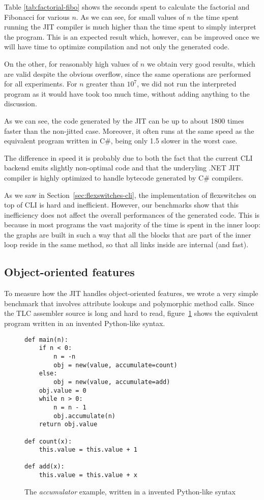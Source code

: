 Table \ref{tab:factorial-fibo} shows the seconds spent to calculate
the factorial and Fibonacci for various $n$.  As we can see, for small values
of $n$ the time spent running the JIT compiler is much higher than the time
spent to simply interpret the program.  This is an expected result
which, however, can be improved once we will have time
to optimize compilation and not only the generated code.

On the other, for reasonably high values of $n$ we obtain very good
results, which are valid despite the obvious overflow, since the 
same operations are performed for all experiments.
For $n$ greater than $10^7$, we did not run the interpreted program as it would have took too
much time, without adding anything to the discussion.

As we can see, the code generated by the JIT can be up to about 1800 times faster
than the non-jitted case.  Moreover, it often runs at the same speed as the
equivalent program written in C\#, being only 1.5 slower in the worst case.

The difference in speed it is probably due to both the fact that the current
CLI backend emits slightly non-optimal code and that the underyling .NET JIT
compiler is highly optimized to handle bytecode generated by C\# compilers.

As we saw in Section~\ref{sec:flexswitches-cli}, the implementation of
flexswitches on top of CLI is hard and inefficient.  However, our benchmarks
show that this inefficiency does not affect the overall performances of the
generated code.  This is because in most programs the vast majority of the
time is spent in the inner loop: the graphs are built in such a way that all
the blocks that are part of the inner loop reside in the same method, so that
all links inside are internal (and fast).


\subsection{Object-oriented features}

To measure how the JIT handles object-oriented features, we wrote a very
simple benchmark that involves attribute lookups and polymorphic method calls.
Since the TLC assembler source is long and hard to read,
figure~\ref{fig:accumulator} shows the equivalent program written in an
invented Python-like syntax.

\begin{figure}[h]
\begin{center}
\begin{lstlisting}
def main(n):
    if n < 0:
        n = -n
        obj = new(value, accumulate=count)
    else:
        obj = new(value, accumulate=add)
    obj.value = 0
    while n > 0:
        n = n - 1
        obj.accumulate(n)
    return obj.value

def count(x):
    this.value = this.value + 1

def add(x):
    this.value = this.value + x
\end{lstlisting}
\caption{The \emph{accumulator} example, written in a invented Python-like syntax}
\label{fig:accumulator}
\end{center}
\end{figure}

